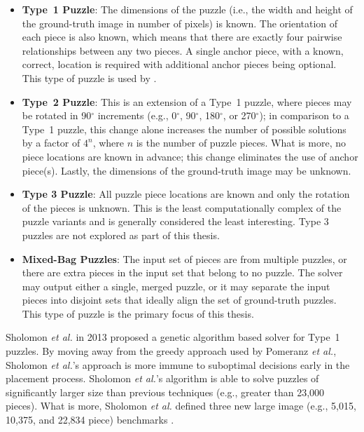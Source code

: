 \documentclass{report}
\newcommand{\numbwithdegreesymbol}[1]{#1$^\circ$}
\begin{document}
\begin{itemize}

	\item \textbf{Type~1 Puzzle}: The dimensions of the puzzle (i.e., the width and height of the ground-truth image in number of pixels) is known.  The orientation of each piece is also known, which means that there are exactly four pairwise relationships between any two pieces.  A single anchor piece, with a known, correct, location is required with additional anchor pieces being optional.  This type of puzzle is used by \cite{cho2010, pomeranz2011}.
	
	\item \textbf{Type~2 Puzzle}: This is an extension of a Type~1 puzzle, where pieces may be rotated in \numbwithdegreesymbol{90} increments (e.g., \numbwithdegreesymbol{0}, \numbwithdegreesymbol{90}, \numbwithdegreesymbol{180}, or \numbwithdegreesymbol{270}); in comparison to a Type~1 puzzle, this change alone increases the number of possible solutions by a factor of $4^n$, where $n$ is the number of puzzle pieces.  What is more, no piece locations are known in advance; this change eliminates the use of anchor piece(s).  Lastly, the dimensions of the ground-truth image may be unknown.
	
	\item \textbf{Type 3 Puzzle}: All puzzle piece locations are known and only the rotation of the pieces is unknown.  This is the least computationally complex of the puzzle variants and is generally considered the least interesting.  Type 3 puzzles are not explored as part of this thesis.
	
	\item \textbf{Mixed-Bag Puzzles}: The input set of pieces are from multiple puzzles, or there are extra pieces in the input set that belong to no puzzle.  The solver may output either a single, merged puzzle, or it may separate the input pieces into disjoint sets that ideally align the set of ground-truth puzzles.  This type of puzzle is the primary focus of this thesis.

\end{itemize}

Sholomon \textit{et al.} \cite{sholomon2013} in 2013 proposed a genetic algorithm based solver for Type~1 puzzles.  By moving away from the greedy approach used by Pomeranz \textit{et al.}, Sholomon \textit{et al.}'s approach is more immune to suboptimal decisions early in the placement process. Sholomon \textit{et al.}'s algorithm is able to solve puzzles of significantly larger size than previous techniques (e.g., greater than 23,000 pieces).  What is more, Sholomon \textit{et al.} defined three new large image (e.g., 5,015, 10,375, and 22,834 piece) benchmarks \cite{sholomonBenchmarkImages}.
\end{document}
